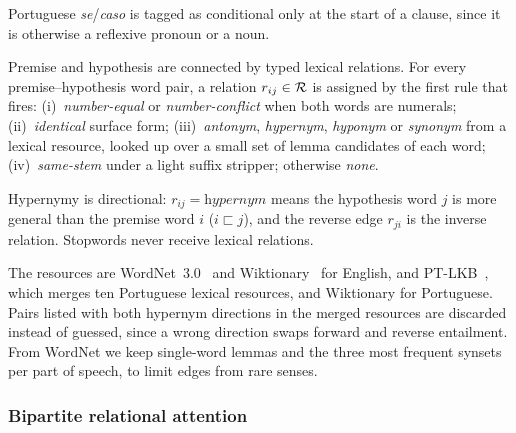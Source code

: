 Portuguese \textit{se}/\textit{caso} is tagged as
conditional only at the start of a clause, since it is otherwise a reflexive pronoun or a noun.

Premise and hypothesis are connected by typed lexical relations. For every premise--hypothesis word
pair, a relation $r_{ij}\in\mathcal{R}$ is assigned by the first rule that
fires: (i)~\emph{number-equal} or \emph{number-conflict} when both words are numerals; (ii)~\emph{identical}
surface form; (iii)~\emph{antonym}, \emph{hypernym}, \emph{hyponym} or \emph{synonym} from a lexical
resource, looked up over a small set of lemma candidates of each word; (iv)~\emph{same-stem} under a light
suffix stripper; otherwise \emph{none}.

Hypernymy is directional: $r_{ij}=\textit{hypernym}$ means the
hypothesis word $j$ is more general than the premise word $i$ ($i\sqsubset j$), and the reverse edge
$r_{ji}$ is the inverse relation. Stopwords never receive lexical relations.

The resources are WordNet~3.0~\citep{miller1995wordnet} and Wiktionary~\citep{ylonen2022wiktextract}
for English, and PT-LKB~\citep{goncalooliveira2018ptlkb,ptlexicalsemantics}, which merges ten Portuguese
lexical resources, and Wiktionary for Portuguese. Pairs listed with
both hypernym directions in the merged resources are discarded instead of guessed, since a wrong
direction swaps forward and reverse entailment. From WordNet we keep single-word lemmas and the three
most frequent synsets per part of speech, to limit edges from rare senses.

\subsubsection{Bipartite relational attention}
\label{sec:bipartite}

